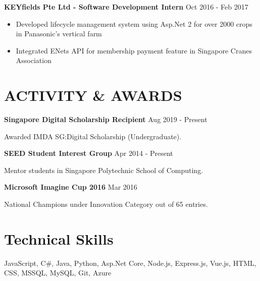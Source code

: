 \documentclass[11pt]{article} %
\begin{document}
\textbf{KEYfields Pte Ltd - Software Development Intern} \hfill Oct 2016 - Feb 2017

\smallskip
\begin{itemize}

    \item Developed lifecycle management system using Asp.Net 2 for over 2000 crops in Panasonic's vertical farm
    \item Integrated ENets API for membership payment feature in Singapore Cranes Association

\end{itemize}


\section*{ACTIVITY \& AWARDS}

\textbf{Singapore Digital Scholarship Recipient} \hfill Aug 2019 - Present

Awarded IMDA SG:Digital Scholarship (Undergraduate).

\bigskip

\textbf{SEED Student Interest Group} \hfill Apr 2014 - Present

Mentor students in Singapore Polytechnic School of Computing.

\bigskip

\textbf{Microsoft Imagine Cup 2016} \hfill Mar 2016

National Champions under Innovation Category out of 65 entries.




\section*{Technical Skills}
JavaScript, C\#, Java, Python, Asp.Net Core, Node.js, Express.js, Vue.js, HTML, CSS, MSSQL, MySQL, Git, Azure
\end{document}

